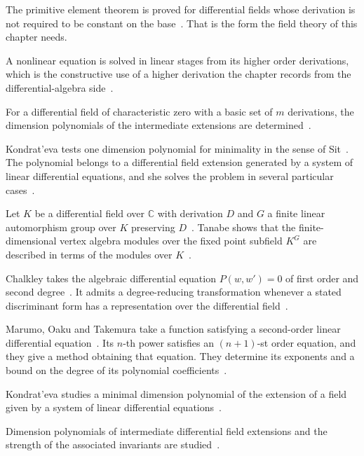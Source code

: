 The primitive element theorem is proved for differential fields whose
derivation is not required to be constant on the base~\cite{WlThePrimitiveElementTheoremForD2015}. That is the form the field theory of this
chapter needs.

A nonlinear equation is solved in linear stages from its higher order
derivations, which is the constructive use of a higher derivation the chapter
records from the differential-algebra
side~\cite{WlSolvingNonlinearEquationsFromH1990}.

For a differential field of characteristic zero with a basic set of $m$
derivations, the dimension polynomials of the intermediate extensions are
determined~\cite{WlDimensionPolynomialsOfIntermed2020}.

Kondrat'eva tests one dimension polynomial for minimality in the
sense of Sit~\cite{WlAMinimalDimensionPolynomialOfA1989}. The polynomial belongs to a differential field extension
generated by a system of linear differential equations, and she solves the
problem in several particular
cases~\cite{WlAMinimalDimensionPolynomialOfA1989}.

Let $K$ be a differential field over $\mathbb{C}$ with derivation $D$ and $G$
a finite linear automorphism group over $K$ preserving $D$~\cite{WlFiniteDimensionalVertexAlgebra2012}. Tanabe shows that
the finite-dimensional vertex algebra modules over the fixed point subfield
$K^G$ are described in terms of the modules over
$K$~\cite{WlFiniteDimensionalVertexAlgebra2012}.

Chalkley takes the algebraic differential equation $P(w,w')=0$ of first
order and second degree~\cite{WlAlgebraicDifferentialEquations1975}. It admits a degree-reducing transformation whenever a
stated discriminant form has a representation over the differential
field~\cite{WlAlgebraicDifferentialEquations1975}.

Marumo, Oaku and Takemura take a function satisfying a second-order linear
differential equation~\cite{WlPropertiesOfPowersOfFunctionsS2015}. Its $n$-th power satisfies an $(n+1)$-st order
equation, and they give a method obtaining that equation. They determine its
exponents and a bound on the degree of its polynomial
coefficients~\cite{WlPropertiesOfPowersOfFunctionsS2015}.

Kondrat'eva studies a minimal dimension polynomial of the extension of a field
given by a system of linear differential
equations~\cite{WlAMinimalDimensionPolynomialOfT2020}.

Dimension polynomials of intermediate differential field extensions and the
strength of the associated invariants are
studied~\cite{WlDimensionPolynomialsOfIntermed2020}.

